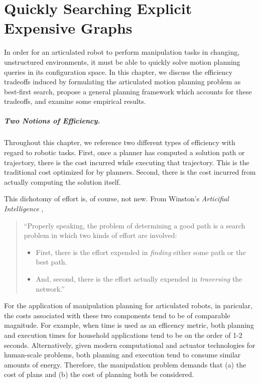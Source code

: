 \chapter{Quickly Searching Explicit Expensive Graphs}
\label{chap:e8}

In order for an articulated robot to perform manipulation tasks
in changing, unstructured environments,
it must be able to quickly solve motion planning queries in its
configuration space.
In this chapter,
we discuss the efficiency tradeoffs induced by formulating
the articulated motion planning problem as best-first search,
propose a general planning framework which accounts for these tradeoffs,
and examine some empirical results.

\paragraph{Two Notions of Efficiency.}

Throughout this chapter,
we reference two different types of efficiency
with regard to robotic tasks.
First, once a planner has computed a solution path or trajectory,
there is the cost incurred while executing that trajectory.
This is the traditional cost optimized for by planners.
Second, there is the cost incurred from actually computing the solution
itself.

This dichotomy of effort is, of course, not new.
From Winston's \emph{Articifial Intelligence} \cite{winston1977ai},
\begin{quote}
   ``Properly speaking, the problem of determining a good path is a search
   problem in which two kinds of effort are involved:
   \begin{itemize}
   \item First, there is the effort expended in \emph{finding} either
      some path or the best path.
   \item And, second, there is the effort actually expended in
      \emph{traversing} the network.''
   \end{itemize}
\end{quote}

For the application of manipulation planning for articulated robots,
in paricular,
the costs associated with these two components tend to be of comparable
magnitude.
For example,
when time is used as an efficency metric,
both planning and execution times for household applications
tend to be on the order of 1-2 seconds.
Alternatively, given
modern computational and actuator technologies for human-scale problems,
both planning and execution tend to consume similar amounts of energy.
Therefore,
the manipulation problem demands that
(a) the cost of plans and
(b) the cost of planning both be considered.

